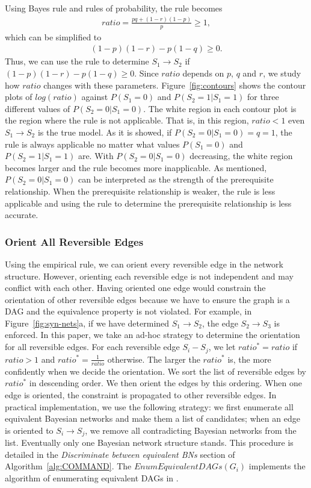 \documentclass{edm_template}
\begin{document}
Using Bayes rule and rules of probability, the rule becomes
\begin{align}
	ratio=\frac{pq+(1-r)(1-p)}{p}\ge 1,
\end{align}
which can be simplified to
\begin{align}
	(1-p)(1-r)-p(1-q)\ge 0.
\end{align}
Thus, we can use the rule to determine $S_1\rightarrow S_2$ if $(1-p)(1-r)-p(1-q)\ge 0$.
Since $ratio$ depends on $p$, $q$ and $r$, we study how $ratio$ changes with these parameters.
Figure~\ref{fig:contours} shows the contour plots of $log(ratio)$ against $P(S_1=0)$ and $P(S_2=1|S_1=1)$ for three different values of $P(S_2=0|S_1=0)$.
The white region in each contour plot is the region where the rule is not applicable. 
That is, in this region, $ratio<1$ even $S_1\rightarrow S_2$ is the true model.
As it is showed, if $P(S_2=0|S_1=0)=q=1$, 
the rule is always applicable no matter what values $P(S_1=0)$ and $P(S_2=1|S_1=1)$ are.
With $P(S_2=0|S_1=0)$ decreasing, the white region becomes larger and the rule becomes more inapplicable.
As mentioned, $P(S_2=0|S_1=0)$ can be interpreted as the strength of the prerequisite relationship. When the prerequisite relationship is weaker, the rule is less applicable 
and using the rule to determine the prerequisite relationship is less accurate.

\subsubsection{Orient All Reversible Edges}
Using the empirical rule, we can orient every reversible edge in the network structure. 
However, orienting each reversible edge is not independent and may conflict with each other.
Having oriented one edge would constrain the orientation of other reversible edges because we have to ensure the graph is a DAG and the equivalence property is not violated.
For example, in Figure~\ref{fig:syn-nets}a, if we have determined $S_1\rightarrow S_2$, the edge $S_2\rightarrow S_3$ is enforced.
In this paper, we take an ad-hoc strategy to determine the orientation for all reversible edges. 
For each reversible edge $S_i-S_j$, we let $ratio^*=ratio$ if $ratio >1$ and $ratio^*=\frac{1}{ratio}$ otherwise. 
The larger the $ratio^*$ is, the more confidently when we decide the orientation.
We sort the list of reversible edges by $ratio^*$ in descending order. We then orient the edges by this ordering.
When one edge is oriented, the constraint is propagated to other reversible edges. In practical implementation, we use the following strategy: 
we first enumerate all equivalent Bayesian networks and make them a list of candidates; 
when an edge is oriented to $S_i\rightarrow S_j$, we remove all contradicting Bayesian networks from the list.
Eventually only one Bayesian network structure stands. This procedure is detailed in the \emph{Discriminate between equivalent BNs} section of Algorithm~\ref{alg:COMMAND}.  
The $EnumEquivalentDAGs(G_i)$ implements the algorithm of enumerating equivalent DAGs in \cite{chen2014finding}.
\end{document}
